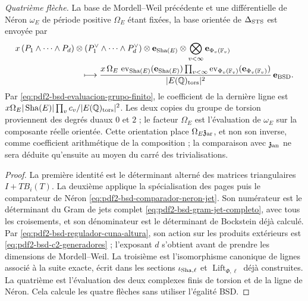 \begin{proposition}
\emph{Quatrième flèche.} La base de Mordell--Weil précédente et une
différentielle de Néron $\omega_E$ de période positive
$\Omega_E$ étant fixées, la base orientée de $\Delta_{\rm STS}$ est envoyée par
\begin{equation}\label{eq:pdf2-bsd-c4-generadores}
 \begin{aligned}
 &x\,(P_1\wedge\cdots\wedge P_d)\otimes
 (P_1^\vee\wedge\cdots\wedge P_d^\vee)\otimes
 \mathbf e_{\operatorname{Sha}(E)}
 \otimes\bigotimes_{v<\infty}\mathbf e_{\Phi_v(\mathbb F_v)}\\
 &\hspace{28mm}\longmapsto
 \frac{x\,\Omega_E\,
   \operatorname{ev}_{\operatorname{Sha}(E)}
      (\mathbf e_{\operatorname{Sha}(E)})
   \prod_{v<\infty}\operatorname{ev}_{\Phi_v(\mathbb F_v)}
      (\mathbf e_{\Phi_v(\mathbb F_v)})}
 {|E(\mathbb Q)_{\rm tors}|^2}\,
 \mathbf e_{\rm BSD}.
\end{aligned}
\end{equation}
Par \eqref{eq:pdf2-bsd-evaluacion-grupo-finito}, le coefficient de la dernière
ligne est
$x\Omega_E|\operatorname{Sha}(E)|\prod_vc_v/
|E(\mathbb Q)_{\rm tors}|^2$.
Les deux copies du groupe de torsion proviennent des degrés duaux $0$ et $2$ ;
le facteur $\Omega_E$ est l'évaluation de $\omega_E$ sur la composante réelle
orientée. Cette orientation place $\Omega_E\mathfrak z_{\rm ar}$, et non son
inverse, comme coefficient arithmétique de la composition ; la comparaison avec
$\mathfrak z_{\rm an}$ ne sera déduite qu'ensuite au moyen du carré des
trivialisations.
\end{proposition}

\begin{proof}
La première identité est le déterminant alterné des matrices triangulaires
$I+TB_i(T)$. La deuxième applique la spécialisation des pages puis
le comparateur de Néron \eqref{eq:pdf2-bsd-comparador-neron-jet}. Son
numérateur est le déterminant du Gram de jets complet
\eqref{eq:pdf2-bsd-gram-jet-completo}, avec tous les croisements, et son dénominateur
est le déterminant de Bockstein déjà calculé. Par
\eqref{eq:pdf2-bsd-regulador-cuna-altura}, son action sur les produits extérieurs est
\eqref{eq:pdf2-bsd-c2-generadores} ; l'exposant $d$ s'obtient avant de
prendre les dimensions de Mordell--Weil. La troisième est l'isomorphisme canonique de lignes associé à la
suite exacte, écrit dans les sections
$\iota_{{\rm Sha},\ell}$ et $\operatorname{Lift}_{\Phi,\ell}$ déjà
construites. La quatrième est l'évaluation des deux complexes finis de
torsion et de la ligne de Néron. Cela calcule les quatre flèches sans utiliser
l'égalité BSD.
\end{proof}

